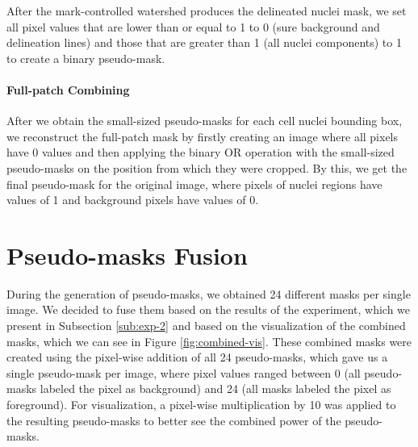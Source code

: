 After the mark-controlled watershed produces the delineated nuclei mask, we set all pixel values that are lower than or equal to 1 to 0 (sure background and delineation lines) and those that are greater than 1 (all nuclei components) to 1 to create a binary pseudo-mask.

\paragraph{Full-patch Combining}
After we obtain the small-sized pseudo-masks for each cell nuclei bounding box, we reconstruct the full-patch mask by firstly creating an image where all pixels have 0 values and then applying the binary OR operation with the small-sized pseudo-masks on the position from which they were cropped. By this, we get the final pseudo-mask for the original image, where pixels of nuclei regions have values of 1 and background pixels have values of 0.

\section{Pseudo-masks Fusion}
\label{section:mask-fusion}
During the generation of pseudo-masks, we obtained 24 different masks per single image. We decided to fuse them based on the results of the experiment, which we present in Subsection \ref{sub:exp-2} and based on the visualization of the combined masks, which we can see in Figure \ref{fig:combined-vis}. These combined masks were created using the pixel-wise addition of all 24 pseudo-masks, which gave us a single pseudo-mask per image, where pixel values ranged between 0 (all pseudo-masks labeled the pixel as background) and 24 (all masks labeled the pixel as foreground). For visualization, a pixel-wise multiplication by 10 was applied to the resulting pseudo-masks to better see the combined power of the pseudo-masks.

